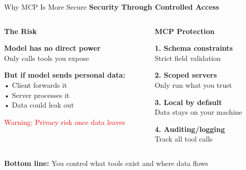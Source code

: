\documentclass[aspectratio=169]{beamer}
\begin{document}
\begin{frame}{Why MCP Is More Secure}
  \centering
  \large\bfseries
  Security Through Controlled Access

  \vspace{0.5cm}

  \begin{columns}[T]
    \begin{column}{0.48\textwidth}
      \centering
      \normalsize\bfseries
      \textcolor{conesaOrange}{The Risk}

      \vspace{0.3cm}
      \normalsize
      \raggedright

      \textbf{Model has no direct power}\\
      \small Only calls tools you expose

      \vspace{0.2cm}
      \normalsize
      \textbf{But if model sends personal data:}\\
      \small • Client forwards it\\
      • Server processes it\\
      • Data could leak out

      \vspace{0.2cm}
      \normalsize
      \textcolor{red}{Warning: Privacy risk once data leaves}
    \end{column}
    \begin{column}{0.48\textwidth}
      \centering
      \normalsize\bfseries
      \textcolor{conesaTeal}{MCP Protection}

      \vspace{0.3cm}
      \normalsize
      \raggedright

      \textbf{1. Schema constraints}\\
      \small Strict field validation

      \vspace{0.2cm}
      \normalsize
      \textbf{2. Scoped servers}\\
      \small Only run what you trust

      \vspace{0.2cm}
      \normalsize
      \textbf{3. Local by default}\\
      \small Data stays on your machine

      \vspace{0.2cm}
      \normalsize
      \textbf{4. Auditing/logging}\\
      \small Track all tool calls
    \end{column}
  \end{columns}

  \vspace{0.5cm}
  \centering
  \normalsize
  \textbf{Bottom line:} You control what tools exist and where data flows
\end{frame}
\end{document}
